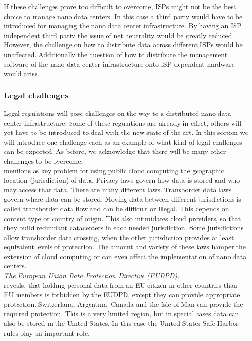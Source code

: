 
If these challenges prove too difficult to overcome, ISPs might not be the best choice to manage nano data centers. In this case a third party would have to be introduced for managing the nano data center infrastructure. By having an ISP independent third party the issue of net neutrality would be greatly reduced. However, the challenge on how to distribute data across different ISPs would be unaffected. Additionally the question of how to distribute the management software of the nano data center infrastructure onto ISP dependent hardware would arise. 


\subsubsection{Legal challenges}
Legal regulations will pose challenges on the way to a distributed nano data center infrastructure. Some of these regulations are already in effect, others will yet have to be introduced to deal with the new state of the art. In this section we will introduce one challenge each as an example of what kind of legal challenges can be expected. As before, we acknowledge that there will be many other challenges to be overcome.\\

\cite{locmat} mentions as key problem for using public cloud computing the geographic location (jurisdiction) of data. Privacy laws govern how data is stored and who may access that data. There are many different laws. Transborder data laws govern where data can be stored. Moving data between different jurisdictions is called transborder data flow and can be difficult or illegal. This depends on content type or country of origin. This also intimidates cloud providers, so that they build redundant datacenters in each needed jurisdiction. Some jurisdictions allow transborder data crossing, when the other jurisdiction provides at least equivalent levels of protection. The amount and variety of these laws hamper the extension of cloud computing or can even affect the implementation of nano data centers.\\

\textit{The European Union Data Protection Directive (EUDPD). }\\
\cite{locmat} reveals, that holding personal data from an EU citizen in other countries than EU members is forbidden by the EUDPD, except they can provide appropriate protection. Switzerland, Argentina, Canada and the Isle of Man can provide the required protection. This is a very limited region, but in special cases data can also be stored in the United States. In this case the United States Safe Harbor rules play an important role.\\

